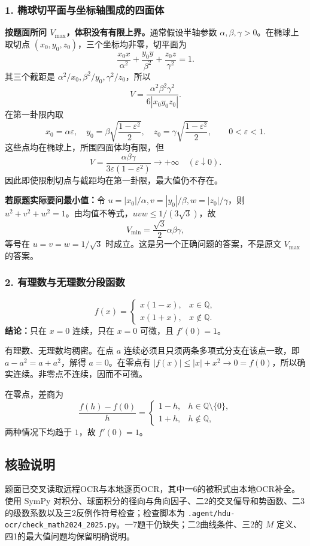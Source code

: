 \documentclass[11pt,fontset=fandol]{ctexart}
\begin{document}
\subsubsection{1.
椭球切平面与坐标轴围成的四面体}\label{ux692dux7403ux5207ux5e73ux9762ux4e0eux5750ux6807ux8f74ux56f4ux6210ux7684ux56dbux9762ux4f53}

\textbf{按题面所问 \(V_{\max}\)，体积没有有限上界。}通常假设半轴参数
\(\alpha,\beta,\gamma>0\)。在椭球上取切点
\((x_0,y_0,z_0)\)，三个坐标均非零，切平面为 \[
\frac{x_0x}{\alpha^2}+\frac{y_0y}{\beta^2}+\frac{z_0z}{\gamma^2}=1.
\] 其三个截距是 \(\alpha^2/x_0,\beta^2/y_0,\gamma^2/z_0\)，所以 \[
V=\frac{\alpha^2\beta^2\gamma^2}{6|x_0y_0z_0|}.
\] 在第一卦限内取 \[
x_0=\alpha\varepsilon,\quad
y_0=\beta\sqrt{\frac{1-\varepsilon^2}{2}},\quad
z_0=\gamma\sqrt{\frac{1-\varepsilon^2}{2}},\qquad0<\varepsilon<1.
\] 这些点均在椭球上，所围四面体均有限，但 \[
V=\frac{\alpha\beta\gamma}{3\varepsilon(1-\varepsilon^2)}\to+\infty
\quad(\varepsilon\downarrow0).
\] 因此即使限制切点与截距均在第一卦限，最大值仍不存在。

\textbf{若原题实际要问最小值：}令
\(u=|x_0|/\alpha,v=|y_0|/\beta,w=|z_0|/\gamma\)，则
\(u^2+v^2+w^2=1\)。由均值不等式，\(uvw\le1/(3\sqrt3)\)，故 \[
\boxed{V_{\min}=\frac{\sqrt3}{2}\alpha\beta\gamma},
\] 等号在 \(u=v=w=1/\sqrt3\) 时成立。这是另一个正确问题的答案，不是原文
\(V_{\max}\) 的答案。

\subsubsection{2.
有理数与无理数分段函数}\label{ux6709ux7406ux6570ux4e0eux65e0ux7406ux6570ux5206ux6bb5ux51fdux6570}

\[
f(x)=\begin{cases}x(1-x),&x\in\mathbb Q,\\x(1+x),&x\notin\mathbb Q.\end{cases}
\] \textbf{结论：}只在 \(x=0\) 连续，只在 \(x=0\) 可微，且 \(f'(0)=1\)。

有理数、无理数均稠密。在点 \(a\)
连续必须且只须两条多项式分支在该点一致，即 \(a-a^2=a+a^2\)，解得
\(a=0\)。在零点有
\(|f(x)|\le|x|+x^2\to0=f(0)\)，所以确实连续。非零点不连续，因而不可微。

在零点，差商为 \[
\frac{f(h)-f(0)}h=\begin{cases}1-h,&h\in\mathbb Q\setminus\{0\},\\1+h,&h\notin\mathbb Q,\end{cases}
\] 两种情况下均趋于 \(1\)，故 \(f'(0)=1\)。

\subsection{核验说明}\label{ux6838ux9a8cux8bf4ux660e}

题面已交叉读取远程OCR与本地逐页OCR，其中一6的被积式由本地OCR补全。使用
SymPy
对积分、球面积分的径向与角向因子、二2的交叉偏导和势函数、二3的级数系数以及三2反例作符号检查；检查脚本为
\texttt{.agent/hdu-ocr/check\_math2024\_2025.py}。一7题干仍缺失；二2曲线条件、三2的
\(M\) 定义、四1的最大值问题均保留明确说明。
\end{document}
